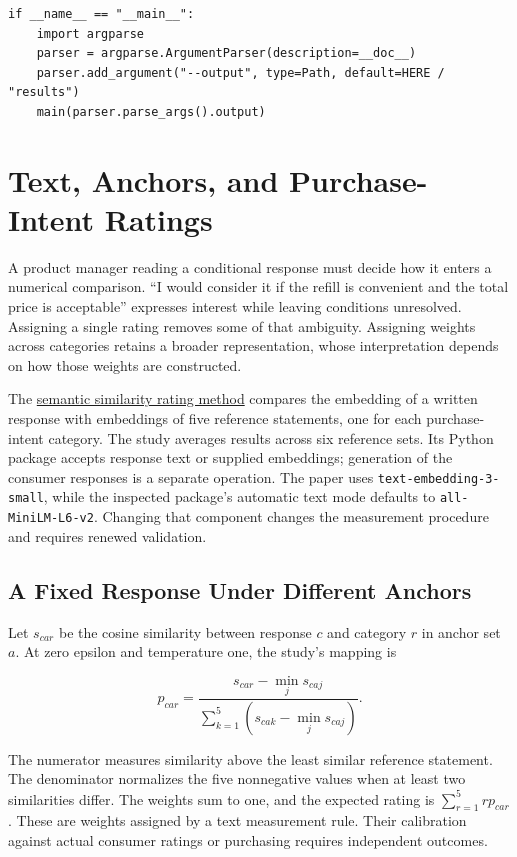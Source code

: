 \begin{Verbatim}[breaklines,breakanywhere,fontsize=\small]
if __name__ == "__main__":
    import argparse
    parser = argparse.ArgumentParser(description=__doc__)
    parser.add_argument("--output", type=Path, default=HERE / "results")
    main(parser.parse_args().output)
\end{Verbatim}

\hypertarget{M05-text-anchors-and-purchase-intent-ratings}{%
\section{Text, Anchors, and Purchase-Intent
Ratings}\label{M05-text-anchors-and-purchase-intent-ratings}}

\noindent \noindent A product manager reading a conditional response must decide
how it enters a numerical comparison. ``I would consider it if the
refill is convenient and the total price is acceptable'' expresses
interest while leaving conditions unresolved. Assigning a single rating
removes some of that ambiguity. Assigning weights across categories
retains a broader representation, whose interpretation depends on how
those weights are constructed.

The \href{https://arxiv.org/abs/2510.08338v3}{semantic similarity rating
method} compares the embedding of a written response with embeddings of
five reference statements, one for each purchase-intent category. The
study averages results across six reference sets. Its Python package
accepts response text or supplied embeddings; generation of the consumer
responses is a separate operation. The paper uses
\texttt{text-embedding-3-small}, while the inspected package's automatic
text mode defaults to \texttt{all-MiniLM-L6-v2}. Changing that component
changes the measurement procedure and requires renewed validation.

\hypertarget{M05-a-fixed-response-under-different-anchors}{%
\subsection{A Fixed Response Under Different
Anchors}\label{M05-a-fixed-response-under-different-anchors}}

\noindent \noindent Let \(s_{car}\) be the cosine similarity between response
\(c\) and category \(r\) in anchor set \(a\). At zero epsilon and
temperature one, the study's mapping is

\[
p_{car}=\frac{s_{car}-\min_j s_{caj}}{\sum_{k=1}^{5}(s_{cak}-\min_j s_{caj})}.
\]

The numerator measures similarity above the least similar reference
statement. The denominator normalizes the five nonnegative values when
at least two similarities differ. The weights sum to one, and the
expected rating is \(\sum_{r=1}^{5} r p_{car}\). These are weights
assigned by a text measurement rule. Their calibration against actual
consumer ratings or purchasing requires independent outcomes.

